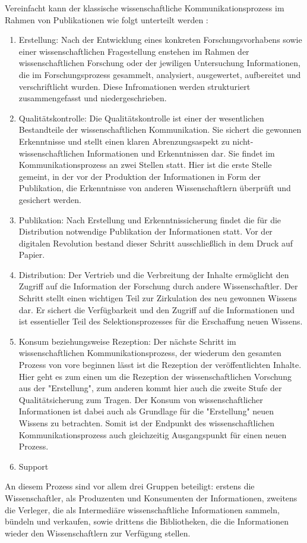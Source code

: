 Vereinfacht kann der klassische wissenschaftliche Kommunikationsprozess im Rahmen von Publikationen wie folgt unterteilt werden\cite{cite:11b} :
\begin{enumerate}
\item Erstellung: 
Nach der Entwicklung eines konkreten Forschungsvorhabens sowie einer wissenschaftlichen Fragestellung enstehen im Rahmen der wissenschaftlichen Forschung oder der jewiligen Untersuchung Informationen\cite{cite:11c}, die im Forschungsprozess gesammelt, analysiert, ausgewertet, aufbereitet und verschriftlicht wurden\cite{cite:11d}. Diese Infromationen werden strukturiert zusammengefasst und niedergeschrieben.\cite{cite:11d}
\item Qualitätskontrolle: 
Die Qualitätskontrolle ist einer der wesentlichen Bestandteile der wissenschaftlichen Kommunikation. Sie sichert die gewonnen Erkenntnisse\cite{cite:11e} und stellt einen klaren Abrenzungsaspekt zu nicht-wissenschaftlichen Informationen und Erkenntnissen dar\cite{cite:11f}. Sie findet im Kommunikationsprozess an zwei Stellen statt. Hier ist die erste Stelle gemeint, in der vor der Produktion der Informationen in Form der Publikation, die Erkenntnisse von anderen Wissenschaftlern überprüft und gesichert werden.\cite{cite:11g}
\item Publikation: 
Nach Erstellung und Erkenntnissicherung findet die für die Distribution notwendige Publikation der Informationen statt. Vor der digitalen Revolution bestand dieser Schritt ausschließlich in dem Druck auf Papier.\cite{cite:11h}
\item Distribution: 
Der Vertrieb und die Verbreitung der Inhalte ermöglicht den Zugriff auf die Information der Forschung durch andere Wissenschaftler. Der Schritt stellt einen wichtigen Teil zur Zirkulation des neu gewonnen Wissens dar\cite{cite:11i}. Er sichert die Verfügbarkeit und den Zugriff auf die Informationen und ist essentieller Teil des Selektionsprozesses für die Erschaffung neuen Wissens.\cite{cite:11l}
\item Konsum beziehungsweise Rezeption: 
Der nächste Schritt im wissenschaftlichen Kommunikationsprozess, der wiederum den gesamten Prozess von vore beginnen lässt ist die Rezeption der veröffentlichten Inhalte. Hier geht es zum einen um die Rezeption der wissenschaftlichen Vorschung aus der "Erstellung", zum anderen kommt hier auch die zweite Stufe der Qualitätsicherung zum Tragen.\cite{cite:11j} Der Konsum von wissenschaftlicher Informationen ist dabei auch als Grundlage für die "Erstellung" neuen Wissens zu betrachten. Somit ist der Endpunkt des wissenschaftlichen Kommunikationsprozess auch gleichzeitig Ausgangspunkt für einen neuen Prozess\cite{cite:11k}.
\item Support
\end{enumerate}
An diesem Prozess sind vor allem drei Gruppen beteiligt: erstens die Wissenschaftler, als Produzenten und Konsumenten der Informationen, zweitens die Verleger, die als Intermediäre wissenschaftliche Informationen sammeln, bündeln und verkaufen, sowie drittens die Bibliotheken, die die Informationen wieder den Wissenschaftlern zur Verfügung stellen.\cite{Odlyzko_1997}

